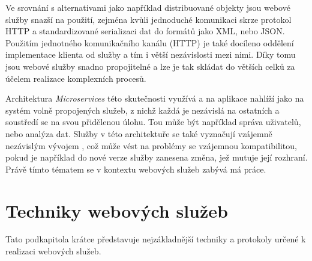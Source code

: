 \documentclass[czech,DP]{thesiskiv}
\begin{document}
Ve srovnání s alternativami jako například distribuované objekty jsou webové služby snazší na použití, zejména kvůli jednoduché komunikaci skrze protokol HTTP a standardizované serializaci dat do formátů jako XML, nebo JSON. Použitím jednotného komunikačního kanálu (HTTP) je také docíleno oddělení implementace klienta od služby a tím i větší nezávislosti mezi nimi. Díky tomu jsou webové služby snadno propojitelné a lze je tak skládat do větších celků za účelem realizace komplexních procesů\cite{fromObjectsToWs}.

Architektura \textit{Microservices} této skutečnosti využívá a na aplikace nahlíží jako na systém volně propojených služeb, z nichž každá je nezávislá na ostatních a soustředí se na svou přidělenou úlohu. Tou může být například správa uživatelů, nebo analýza dat. Služby v této architektuře se také vyznačují vzájemně nezávislým vývojem \cite{microservices}, což může vést na problémy se vzájemnou kompatibilitou, pokud je například do nové verze služby zanesena změna, jež mutuje její rozhraní. Právě tímto tématem se v kontextu webových služeb zabývá má práce.



\section{Techniky webových služeb}
\label{sec:ws-tech}

Tato podkapitola krátce představuje nejzákladnější techniky a protokoly určené k realizaci webových služeb.

\end{document}
